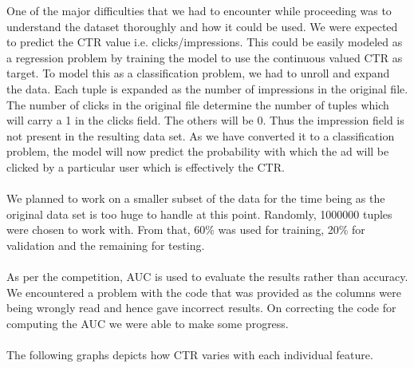 \documentclass[10pt]{article}
\begin{document}
One of the major difficulties that we had to encounter while proceeding was to understand the dataset thoroughly and how it could be used. We were expected to predict the CTR value i.e. clicks/impressions. This could be easily modeled as a regression problem by training the model to use the continuous valued CTR as target. To model this as a classification problem, we had to unroll and expand the data. Each tuple is expanded as the number of impressions in the original file. The number of clicks in the original file determine the number of tuples which will carry a 1 in the clicks field. The others will be 0. Thus the impression field is not present in the resulting data set. As we have converted it to a classification problem, the model will now predict the probability with which the ad will be clicked by a particular user which is effectively the CTR. \\\\

We planned to work on a smaller subset of the data for the time being as the original data set is too huge to handle at this point. Randomly, 1000000 tuples were chosen to work with. From that, 60\% was used for training, 20\% for validation and the remaining for testing.\\\\

As per the competition, AUC is used to evaluate the results rather than accuracy. We encountered a problem with the code that was provided as the columns were being wrongly read and hence gave incorrect results. On correcting the code for computing the AUC we were able to make some progress. \\\\

The following graphs depicts how CTR varies with each individual feature.\\
\end{document}
